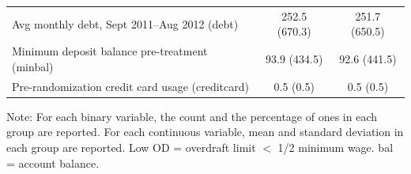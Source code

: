 \begin{landscape}
\begin{table}[ht]
\begin{threeparttable}
\begin{tabular*}{\columnwidth}{@{\extracolsep\fill}>{\raggedright\arraybackslash}p{9cm}cc@{\extracolsep\fill}}
\quad Avg monthly debt, Sept 2011--Aug 2012 (debt) & 252.5 (670.3) & 251.7 (650.5) \\
\quad Minimum deposit balance pre-treatment (minbal) & 93.9 (434.5) & 92.6 (441.5) \\
\quad Pre-randomization credit card usage (creditcard) & 0.5 (0.5) & 0.5 (0.5) \\
\bottomrule
\end{tabular*}
\begin{tablenotes}[flushleft]
\footnotesize
\item Note: For each binary variable, the count and the percentage of ones in each group are reported. For each continuous variable, mean and standard deviation in each group are reported. Low OD = overdraft limit $<$ 1/2 minimum wage. bal = account balance.
\end{tablenotes}
\end{threeparttable}
\end{table}
\end{landscape}

